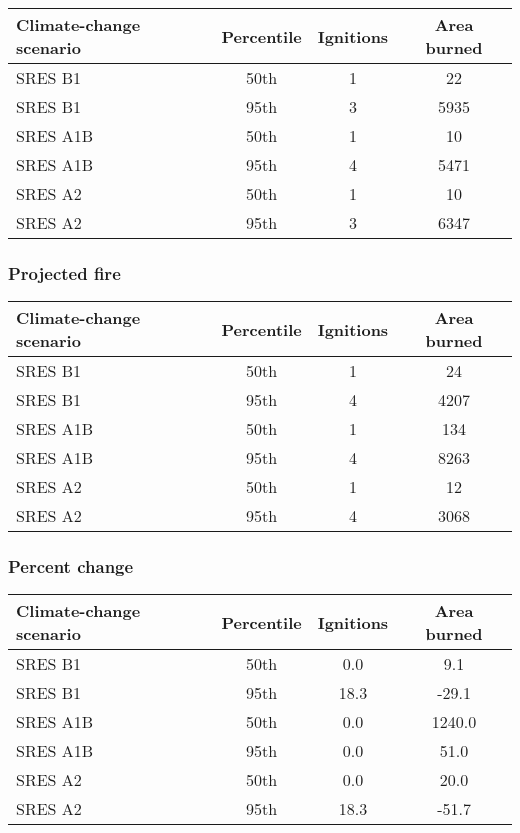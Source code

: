 \documentclass{article}\usepackage[]{graphicx}\usepackage[]{color}
\newcommand{\headcol}{\rowcolor{tableheadcolor}}
\begin{document}
\begin{table}[ht]
\centering
\begin{tabular}{lccc}
  \headcol 
 \toprule
Climate-change scenario & Percentile & Ignitions & Area burned \\ 
  \midrule
SRES B1 & 50th & 1 & 22 \\ 
  SRES B1 & 95th & 3 & 5935 \\ 
  SRES A1B & 50th & 1 & 10 \\ 
  SRES A1B & 95th & 4 & 5471 \\ 
  SRES A2 & 50th & 1 & 10 \\ 
  SRES A2 & 95th & 3 & 6347 \\ 
   \bottomrule
\end{tabular}
\end{table}


\subsubsection{Projected fire}

\begin{table}[ht]
\centering
\begin{tabular}{lccc}
  \headcol 
 \toprule
Climate-change scenario & Percentile & Ignitions & Area burned \\ 
  \midrule
SRES B1 & 50th & 1 & 24 \\ 
  SRES B1 & 95th & 4 & 4207 \\ 
  SRES A1B & 50th & 1 & 134 \\ 
  SRES A1B & 95th & 4 & 8263 \\ 
  SRES A2 & 50th & 1 & 12 \\ 
  SRES A2 & 95th & 4 & 3068 \\ 
   \bottomrule
\end{tabular}
\end{table}


\subsubsection{Percent change}

\begin{table}[ht]
\centering
\begin{tabular}{lccc}
  \headcol 
 \toprule
Climate-change scenario & Percentile & Ignitions & Area burned \\ 
  \midrule
SRES B1 & 50th & 0.0 & 9.1 \\ 
  SRES B1 & 95th & 18.3 & -29.1 \\ 
  SRES A1B & 50th & 0.0 & 1240.0 \\ 
  SRES A1B & 95th & 0.0 & 51.0 \\ 
  SRES A2 & 50th & 0.0 & 20.0 \\ 
  SRES A2 & 95th & 18.3 & -51.7 \\ 
   \bottomrule
\end{tabular}
\end{table}
\end{document}
